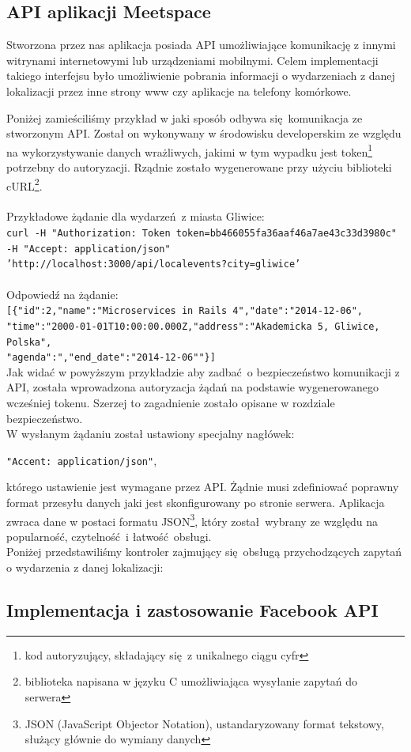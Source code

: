 \subsection{API aplikacji Meetspace}
  Stworzona przez nas aplikacja posiada API umożliwiające komunikację z innymi witrynami internetowymi lub urządzeniami mobilnymi. Celem implementacji takiego interfejsu było umożliwienie pobrania informacji o wydarzeniach z danej lokalizacji przez inne strony www czy aplikacje na telefony komórkowe.


  Poniżej zamieściliśmy przykład w jaki sposób odbywa się komunikacja ze stworzonym API. Został on wykonywany w środowisku developerskim ze względu na wykorzystywanie danych wrażliwych, jakimi w tym wypadku jest token\footnote{kod autoryzujący, składający się z unikalnego ciągu cyfr} potrzebny do autoryzacji. Rządnie zostało wygenerowane przy użyciu biblioteki cURL\footnote{biblioteka napisana w języku C umożliwiająca wysyłanie zapytań do serwera}.
  \\ \\
  Przykładowe żądanie dla wydarzeń z miasta Gliwice:\\
    \texttt{curl -H "Authorization: Token token=bb466055fa36aaf46a7ae43c33d3980c"
    -H "Accept: application/json"\\
    'http://localhost:3000/api/localevents?city=gliwice'}\\ \\
  Odpowiedź na żądanie:\\
    \texttt{[\{"id":2,"name":"Microservices in Rails 4","date":"2014-12-06",\\
    "time":"2000-01-01T10:00:00.000Z,"address":"Akademicka 5, Gliwice, Polska",\\
    "agenda":","end\_{}date":"2014-12-06""\}]}\\

  Jak widać w powyższym przykładzie aby zadbać o bezpieczeństwo komunikacji z API, została wprowadzona autoryzacja żądań na podstawie wygenerowanego wcześniej tokenu. Szerzej to zagadnienie zostało opisane w rozdziale bezpieczeństwo.\\
  W wysłanym żądaniu został ustawiony specjalny nagłówek:
  \begin{center}
    \texttt{"Accent: application/json"},
  \end{center}
  którego ustawienie jest wymagane przez API. Żądnie musi zdefiniować poprawny format przesyłu danych jaki jest skonfigurowany po stronie serwera.
  Aplikacja zwraca dane w postaci formatu JSON\footnote{JSON (JavaScript Objector Notation), ustandaryzowany format tekstowy, służący głównie do wymiany danych\cite{json}}, który został wybrany ze względu na popularność, czytelność i łatwość obsługi.\\
  Poniżej przedstawiliśmy kontroler zajmujący się obsługą przychodzących zapytań o wydarzenia z danej lokalizacji:\\

  

\subsection{Implementacja i zastosowanie Facebook API}
